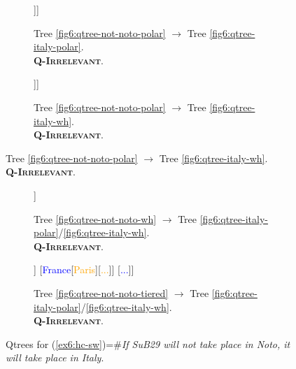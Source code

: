 \begin{figure}[H]
	\centering
	\begin{subfigure}[b]{.45\linewidth}
		\centering
		\scalebox{1}
		{\begin{forest}
				[CS [\textcolor{orange}{Noto}] [{$\neg$\textcolor{orange}{Noto}} [\fbox{\textcolor{blue}{Italy}$\cap\neg$\textcolor{orange}{Noto}}][$\neg$\textcolor{blue}{Italy}]]]
		\end{forest}}
		\caption[]{Tree \ref{fig6:qtree-not-noto-polar} $\rightarrow$ Tree \ref{fig6:qtree-italy-polar}.\\\textsc{\textbf{Q-Irrelevant}}.}\label{fig6:tree-hc-sw-polar-polar-r}
	\end{subfigure}\hfill
	\begin{subfigure}[b]{.45\linewidth}
		\centering
		\scalebox{1}
		{\begin{forest}
				[CS [\textcolor{orange}{Noto}] [{$\neg$\textcolor{orange}{Noto}} [\fbox{\textcolor{blue}{Italy}$\cap\neg$\textcolor{orange}{Noto}}][\textcolor{blue}{France}] [\textcolor{blue}{...}]]]
		\end{forest}}
		\caption[]{Tree \ref{fig6:qtree-not-noto-polar} $\rightarrow$ Tree \ref{fig6:qtree-italy-wh}.\\\textsc{\textbf{Q-Irrelevant}}.}\label{fig6:tree-hc-sw-polar-wh-r}
	\end{subfigure}
\end{figure}
\begin{figure}[H]
\ContinuedFloat
\centering	
	\begin{subfigure}[b]{.45\linewidth}
		\centering
		\scalebox{1}
		{\begin{forest}
				[CS [\textcolor{orange}{Noto}] [\fbox{\textcolor{orange}{Rome}}] [\fbox{\textcolor{orange}{...}}] [\textcolor{orange}{Paris}] [\textcolor{orange}{...}]]
		\end{forest}}
		\caption[]{Tree \ref{fig6:qtree-not-noto-wh} $\rightarrow$ Tree \ref{fig6:qtree-italy-polar}/\ref{fig6:qtree-italy-wh}.\\\textsc{\textbf{Q-Irrelevant}}.}\label{fig6:tree-hc-sw-wh-r}
	\end{subfigure}\hfill
	\begin{subfigure}[b]{.45\linewidth}
		\centering
		\scalebox{1}
		{\begin{forest}
				[CS [\textcolor{blue}{Italy}[\textcolor{orange}{Noto}] [\fbox{\textcolor{orange}{Rome}}] [\fbox{\textcolor{orange}{...}}]]  [\textcolor{blue}{France}[\textcolor{orange}{Paris}][\textcolor{orange}{...}]] [\textcolor{blue}{...}]]
		\end{forest}}
		\caption[]{Tree \ref{fig6:qtree-not-noto-tiered} $\rightarrow$ Tree \ref{fig6:qtree-italy-polar}/\ref{fig6:qtree-italy-wh}.\\\textsc{\textbf{Q-Irrelevant}}.}\label{fig6:tree-hc-sw-wh-wh-r}
	\end{subfigure}
	\caption[]{Qtrees for (\ref{ex6:hc-sw})=\#\textit{If SuB29 will not take place in Noto, it will take place in Italy}.}
	\label{fig6:qtrees-hc-sw-r}
\end{figure}



